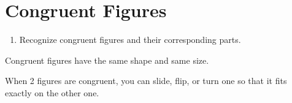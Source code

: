 \documentclass{article}
\begin{document}
\section*{Congruent Figures}

\begin{tcolorbox}[colframe=orange!70!white, coltitle=black, title=\textbf{Today I Can}]
\begin{enumerate}
    \item Recognize congruent figures and their corresponding parts.
\end{enumerate}
\end{tcolorbox}

\begin{tcolorbox}[colframe=black!20!white, opacitybacktitle=0.1, coltitle=black, title=\textbf{Congruent Figures}]
Congruent figures have the same shape and same size. \newline

When 2 figures are congruent, you can slide, flip, or turn one so that it fits exactly on the other one.
\end{tcolorbox}
\end{document}
